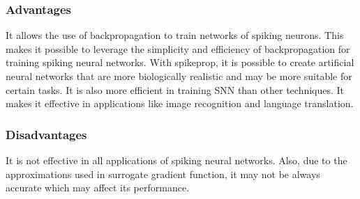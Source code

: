 \subsubsection{Advantages}
It allows the use of backpropagation to train networks of spiking neurons. This
makes it possible to leverage the simplicity and efficiency of backpropagation
for training spiking neural networks. With spikeprop, it is possible to create
artificial neural networks that are more biologically realistic and may be more
suitable for certain tasks. It is also more efficient in training SNN than
other techniques. It makes it effective in applications like image recognition
and language translation.
\subsubsection{Disadvantages}
It is not effective in all applications of spiking neural networks. Also, due to
the approximations used in surrogate gradient function, it may not be always
accurate which may affect its performance.